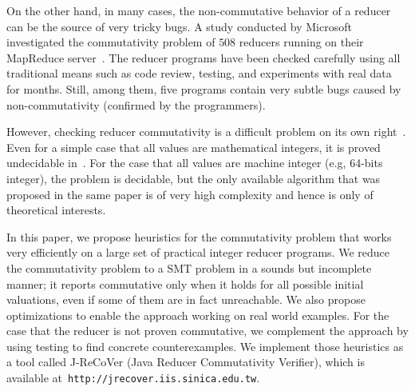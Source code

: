 \documentclass{llncs}
\newcommand{\hide}[1]{}
\begin{document}
\hide{More concretely, for the verification of a MapReduce program, we propose to do it in two phases. First, ensuring if all reducers are commutative. If some reducers are non-commutative, modifying them to commutative ones. Usually, the modification is not a difficult task~\cite{xiao14mr}, and can be done without affecting their functionality and performance. For example, assume that the task of a reducer is to find the name of the person with highest score. Such a reducer is non-commutative when the input include two people with the same highest score. This reducer can be made commutative, by also comparing the ID number of people with the same score. Once all reducers are made commutative, we reduce the verification problem to sequential verification by fixing a scheduler. In this two-phase approach, the key enabling technique is an efficient procedure for checking reducer commutativity.}

On the other hand, in many cases, the non-commutative behavior of a reducer can be the source of very tricky bugs. A study conducted by Microsoft investigated the commutativity problem of $508$ reducers running on their MapReduce server~\cite{xiao14mr}. The reducer programs have been checked carefully using all traditional means such as code review, testing, and experiments with real data for months. Still, among them, five programs contain very subtle bugs caused by non-commutativity (confirmed by the programmers). 

However, checking reducer commutativity is a difficult problem on its own right~\cite{ChenHSW15,ChenSW16,ChenLTW17}. Even for a simple case that all values are mathematical integers, it is proved undecidable in~\cite{ChenHSW15}. For the case that all values are machine integer (e.g, 64-bits integer), the problem is decidable, but the only available algorithm that was proposed in the same paper is of very high complexity and hence is only of theoretical interests. 

In this paper, we propose heuristics for the commutativity problem that works very efficiently on a large set of practical integer reducer programs. We reduce the commutativity problem to a SMT problem in a sounds but incomplete manner; it  reports commutative only when it holds for all possible initial valuations, even if some of them are in fact unreachable. We also propose optimizations to enable the approach working on real world examples. For the case that the reducer is not proven commutative, we complement the approach by using testing to find concrete counterexamples. We implement those heuristics as a tool called J-ReCoVer (Java Reducer Commutativity Verifier), which is available at~\verb|http://jrecover.iis.sinica.edu.tw|.
\end{document}
